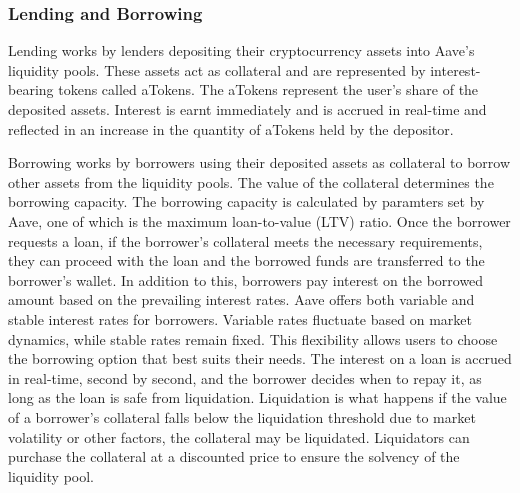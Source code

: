 \subsubsection{Lending and Borrowing}

Lending works by lenders depositing their cryptocurrency assets into Aave's liquidity pools. These assets act as collateral and are represented by interest-bearing tokens called aTokens. The aTokens represent the user's share of the deposited assets. Interest is earnt immediately and is accrued in real-time and reflected in an increase in the quantity of aTokens held by the depositor.

Borrowing works by borrowers using their deposited assets as collateral to borrow other assets from the liquidity pools. The value of the collateral determines the borrowing capacity. The borrowing capacity is calculated by paramters set by Aave, one of which is the maximum loan-to-value (LTV) ratio. Once the borrower requests a loan, if the borrower's collateral meets the necessary requirements, they can proceed with the loan and the borrowed funds are transferred to the borrower's wallet. In addition to this, borrowers pay interest on the borrowed amount based on the prevailing interest rates. Aave offers both variable and stable interest rates for borrowers. Variable rates fluctuate based on market dynamics, while stable rates remain fixed. This flexibility allows users to choose the borrowing option that best suits their needs. The interest on a loan is accrued in real-time, second by second, and the borrower decides when to repay it, as long as the loan is safe from liquidation. Liquidation is what happens if the value of a borrower's collateral falls below the liquidation threshold due to market volatility or other factors, the collateral may be liquidated. Liquidators can purchase the collateral at a discounted price to ensure the solvency of the liquidity pool.

